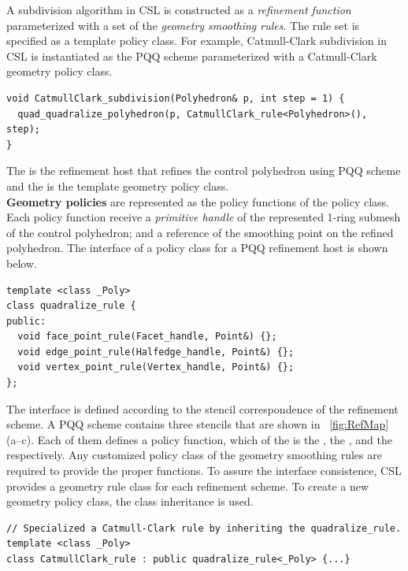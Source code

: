 A subdivision algorithm in CSL is constructed as a
\emph{refinement function} parameterized with a set of the  
\emph{geometry smoothing rules}. The rule set is specified as
a template policy class. For example, Catmull-Clark
subdivision in CSL is instantiated as the PQQ scheme 
parameterized with a Catmull-Clark geometry policy class.
\begin{lstlisting}
void CatmullClark_subdivision(Polyhedron& p, int step = 1) {
  quad_quadralize_polyhedron(p, CatmullClark_rule<Polyhedron>(), step);
}
\end{lstlisting}
The  is the refinement host
that refines the control polyhedron using PQQ scheme and the  
 is the template geometry policy class.
\\

\noindent \textbf{Geometry policies} are represented as
the policy functions of the policy class. Each policy function
receive a \emph{primitive handle} of the represented 1-ring submesh 
of the control polyhedron; and a reference of the smoothing point
on the refined polyhedron. The interface of a policy class for a PQQ
refinement host is shown below.
\begin{lstlisting}
template <class _Poly>
class quadralize_rule {
public:
  void face_point_rule(Facet_handle, Point&) {};
  void edge_point_rule(Halfedge_handle, Point&) {};
  void vertex_point_rule(Vertex_handle, Point&) {};
};
\end{lstlisting}
The interface is defined according to the stencil correspondence of
the refinement scheme. A PQQ scheme contains three stencils that are
shown in \figurename\ \ref{fig:RefMap} (a--c). Each of them
defines a policy function, which of the  
is the , 
the , and the  
respectively. Any customized policy class of the geometry 
smoothing rules are required to provide the proper functions.
To assure the interface consistence, CSL provides
a geometry rule class for each refinement scheme. To create a new
geometry policy class, the class inheritance is used.
\begin{lstlisting}
// Specialized a Catmull-Clark rule by inheriting the quadralize_rule.
template <class _Poly>
class CatmullClark_rule : public quadralize_rule<_Poly> {...}
\end{lstlisting}

